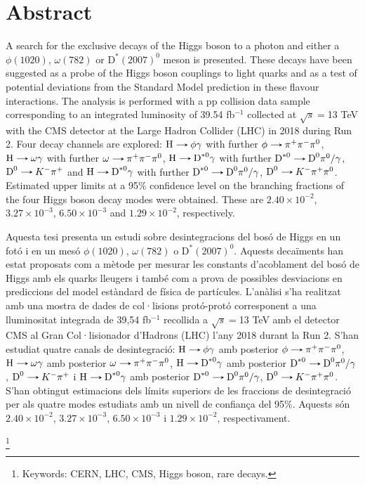 \thispagestyle{empty}
\makeatletter
\@openrightfalse
\makeatother
\chapter*{Abstract}

\vspace*{-0.2cm}

A search for the exclusive decays of the Higgs boson to a photon and either a $\phi(1020)$, $\omega(782)$ or $\text{D}^{*}(2007)^{0}$ meson is presented. These decays have been suggested as a probe of the Higgs boson couplings to light quarks and as a test of potential deviations from the Standard Model prediction in these flavour interactions. The analysis is performed with a pp collision data sample corresponding to an integrated luminosity of 39.54 fb$^{-1}$ collected at $\sqrt{s}=$13 TeV with the CMS detector at the Large Hadron Collider (LHC) in 2018 during Run 2. Four decay channels are explored: $\text{H}\decaysto \phi\gamma$ with further $\phi\decaysto \pi^+\pi^-\pi^0$, $\text{H}\decaysto \omega\gamma$ with further $\omega\decaysto \pi^+\pi^-\pi^0$, $\text{H}\decaysto \text{D}^{*0}\gamma$ with further $\text{D}^{*0}\decaysto \text{D}^{0}\pi^{0}/\gamma$, $\text{D}^{0}\decaysto K^{-}\pi^{+}$ and $\text{H}\decaysto \text{D}^{*0}\gamma$ with further $\text{D}^{*0}\decaysto \text{D}^{0}\pi^{0}/\gamma$, $\text{D}^{0}\decaysto K^{-}\pi^{+}\pi^{0}$. Estimated upper limits at a 95\% confidence level on the branching fractions of the four Higgs boson decay modes were obtained. These are $2.40 \times 10^{-2}$, $3.27 \times 10^{-3}$, $6.50 \times 10^{-3}$ and $1.29 \times 10^{-2}$, respectively.

\vspace*{1.5cm}

Aquesta tesi presenta un estudi sobre desintegracions del bosó de Higgs en un fotó i en un mesó $\phi(1020)$, $\omega(782)$ o $\text{D}^{*}(2007)^{0}$. Aquests decaïments han estat proposats com a mètode per mesurar les constants d'acoblament del bosó de Higgs amb els quarks lleugers i també com a prova de possibles desviacions en prediccions del model estàndard de física de partícules. L'anàlisi s'ha realitzat amb una mostra de dades de col·lisions protó-protó corresponent a una lluminositat integrada de 39,54 fb$^{-1}$ recollida a $\sqrt{s}=$13 TeV amb el detector CMS al Gran Col·lisionador d'Hadrons (LHC) l'any 2018 durant la Run 2. S'han estudiat quatre canals de desintegració: $\text{H}\decaysto \phi\gamma$ amb posterior $\phi\decaysto \pi^+\pi^-\pi^0$, $\text{H}\decaysto \omega\gamma$ amb posterior $\omega\decaysto \pi^+\pi^-\pi^0$, $\text{H}\decaysto \text{D}^{*0}\gamma$ amb posterior $\text{D}^{*0}\decaysto \text{D}^{0}\pi^{0}/\gamma$, $\text{D}^{0}\decaysto K^{-}\pi^{+}$ i $\text{H}\decaysto \text{D}^{*0}\gamma$ amb posterior $\text{D}^{*0}\decaysto \text{D}^{0}\pi^{0}/\gamma$, $\text{D}^{0}\decaysto K^{-}\pi^{+}\pi^{0}$. S'han obtingut estimacions dels límits superiors de les fraccions de desintegració per als quatre modes estudiats amb un nivell de confiança del 95\%. Aquests són $2.40 \times 10^{-2}$, $3.27 \times 10^{-3}$, $6.50 \times 10^{-3}$ i $1.29 \times 10^{-2}$, respectivament.

\vspace*{-0.2cm}


{\let\thefootnote\relax\footnote{Keywords: CERN, LHC, CMS, Higgs boson, rare decays.}}
